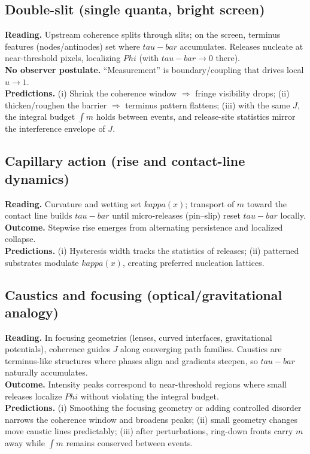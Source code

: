 \documentclass[12pt]{article}
\newcommand{\FoldDensity}{\Phi}
\newcommand{\FoldTime}{\bar{\tau}}
\newcommand{\Threshold}{\kappa}
\def\FoldDensity{Phi}%
\def\FoldTime{tau-bar}%
\def\Threshold{kappa}%
\def\bar#1{#1}%
\begin{document}
\subsection{Double-slit (single quanta, bright screen)}
\textbf{Reading.} Upstream coherence splits through slits; on the screen, terminus features (nodes/antinodes) set where $\FoldTime$ accumulates. Releases nucleate at near-threshold pixels, localizing $\FoldDensity$ (with $\FoldTime\to 0$ there).\\
\textbf{No observer postulate.} ``Measurement'' is boundary/coupling that drives local $u\to 1$.\\
\textbf{Predictions.} (i) Shrink the coherence window $\Rightarrow$ fringe visibility drops; (ii) thicken/roughen the barrier $\Rightarrow$ terminus pattern flattens; (iii) with the same $J$, the integral budget $\int m$ holds between events, and release-site statistics mirror the interference envelope of $J$.

\subsection{Capillary action (rise and contact-line dynamics)}
\textbf{Reading.} Curvature and wetting set $\Threshold(x)$; transport of $m$ toward the contact line builds $\FoldTime$ until micro-releases (pin--slip) reset $\FoldTime$ locally.\\
\textbf{Outcome.} Stepwise rise emerges from alternating persistence and localized collapse.\\
\textbf{Predictions.} (i) Hysteresis width tracks the statistics of releases; (ii) patterned substrates modulate $\Threshold(x)$, creating preferred nucleation lattices.

\subsection{Caustics and focusing (optical/gravitational analogy)}
\textbf{Reading.} In focusing geometries (lenses, curved interfaces, gravitational potentials), coherence guides $J$ along converging path families. Caustics are terminus-like structures where phases align and gradients steepen, so $\FoldTime$ naturally accumulates.\\
\textbf{Outcome.} Intensity peaks correspond to near-threshold regions where small releases localize $\FoldDensity$ without violating the integral budget.\\
\textbf{Predictions.} (i) Smoothing the focusing geometry or adding controlled disorder narrows the coherence window and broadens peaks; (ii) small geometry changes move caustic lines predictably; (iii) after perturbations, ring-down fronts carry $m$ away while $\int m$ remains conserved between events.
\end{document}
